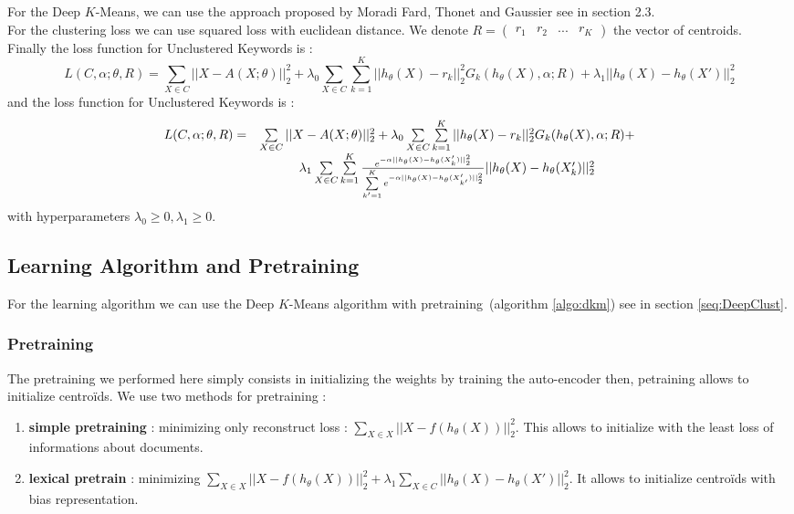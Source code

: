 For the Deep $K$-Means, we can use the approach proposed by Moradi Fard, Thonet and Gaussier 
\cite{Deap-K-Means} see in section 2.3.\\
For the clustering loss we can use squared loss with euclidean distance. We
denote $R = \begin{pmatrix} r_1 & r_2 & ... & r_K\end{pmatrix}$ the vector of
centroids.\\
Finally the loss function for Unclustered Keywords is :
\begin{equation}
L(C ,\alpha;\theta,R) = \sum\limits_{X \in C} ||X - A(X;\theta)||_2^2 + 
\lambda_0 \sum\limits_{X \in C}\sum\limits_{k=1}^K||h_\theta(X) - r_k ||_2^2 G_{k}(h_\theta(X), \alpha; R) + 
\lambda_1|| h_\theta(X) - h_\theta(X')||_2^2
\end{equation}
and the loss function for Unclustered Keywords is :
\begin{equation}
\begin{array}{c c}
L(C ,\alpha;\theta,R) = & \sum\limits_{X \in C} ||X - A(X;\theta)||_2^2 + 
\lambda_0 \sum\limits_{X \in C}\sum\limits_{k=1}^K||h_\theta(X) - r_k ||_2^2 G_{k}(h_\theta(X), \alpha; R) + 
\\ & \lambda_1\sum\limits_{X \in C} \sum\limits_{k = 1}^K \frac{e^{-\alpha|| h_\theta(X) - 
h_\theta(X'_k)||_2^2}}{\sum\limits_{k' = 1}^K e^{-\alpha|| h_\theta(X) - 
h_\theta(X'_{k'})||_2^2}}|| h_\theta(X) - h_\theta(X'_{k})||_2^2
\end{array}
\end{equation}
with hyperparameters $\lambda_0 \geq 0, \lambda_1 \geq 0$.\\

\subsection{Learning Algorithm and Pretraining}

For the learning algorithm we can use the Deep $K$-Means algorithm with 
pretraining~(algorithm \ref{algo:dkm}) see in section \ref{seq:DeepClust}. 
 
\subsubsection{Pretraining}
The pretraining we performed here simply consists in initializing the weights by training 
the auto-encoder then, petraining allows to initialize centroïds.
We use two methods for pretraining : 
\begin{enumerate} 
\item \textbf{simple pretraining} : minimizing only reconstruct loss :
  $\sum\limits_{X \in X} || X - f(h_\theta(X))||_2^2$. This allows to 
  initialize with the least loss of informations about documents.   
\item \textbf{lexical pretrain} : minimizing $\sum\limits_{X \in X} || X - f(h_\theta(X))||_2^2 + 
  \lambda_1 \sum\limits_{X \in C} || h_\theta(X) - h_\theta(X')||_2^2$. 
  It allows to initialize centroïds with bias representation.
\end{enumerate}

